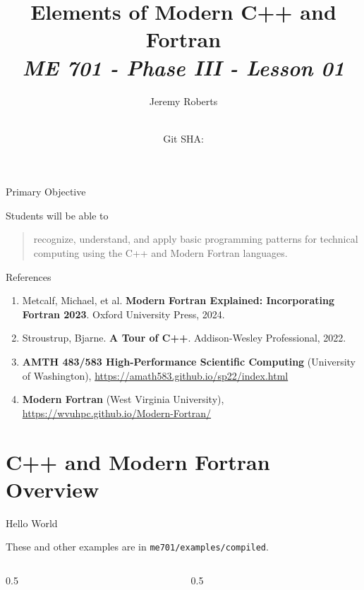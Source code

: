 \documentclass[aspectratio=1610]{beamer}
\title{Elements of Modern C++ and Fortran \\
       {\small\it ME 701 - Phase III - Lesson 01}}
\date{ \\ {\footnotesize Git SHA: }}
\author{Jeremy Roberts}
\begin{document}
\begin{frame}
\titlepage
\end{frame}
 
 
\begin{frame}{Primary Objective}

Students will be able to 

\vfill

\begin{quote}
\textcolor{wcprimary}{recognize, understand, and apply basic programming patterns for technical computing using the C++ and Modern Fortran languages.
}
\end{quote}

\vfill 

\end{frame}


\begin{frame}{References}

\begin{enumerate}
 \item Metcalf, Michael, et al. {\bf Modern Fortran Explained: Incorporating Fortran 2023}. Oxford University Press, 2024.
 \item Stroustrup, Bjarne. {\bf A Tour of C++}. Addison-Wesley Professional, 2022.
 \item {\bf AMTH 483/583 High-Performance Scientific Computing} (University of Washington), \url{https://amath583.github.io/sp22/index.html}
 \item {\bf Modern Fortran} (West Virginia University), \url{https://wvuhpc.github.io/Modern-Fortran/}
\end{enumerate}

\end{frame}


\section{C++ and Modern Fortran Overview}

\begin{frame}{Hello World}

These and other examples are in \textcolor{wcprimary}{\tt me701/examples/compiled}.


\begin{columns}[c]
  \begin{column}{0.5\textwidth}
    
  \end{column}
  \begin{column}{0.5\textwidth}
    
  \end{column}
\end{columns}

\end{frame}
\end{document}
